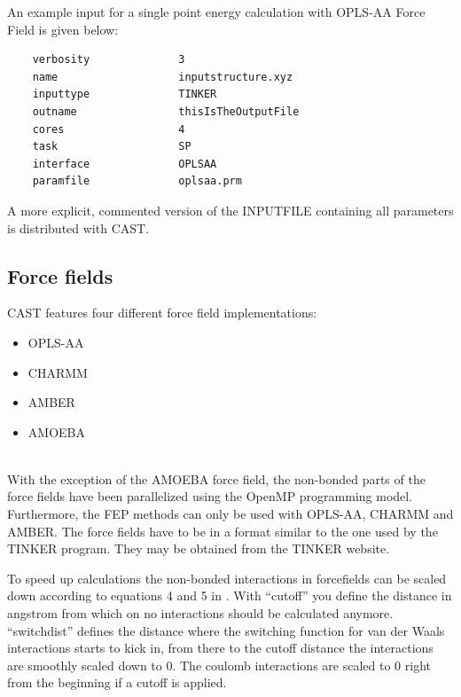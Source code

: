 \documentclass[10pt,a4paper]{article} %
\begin{document}
	An example input for a single point energy calculation with \ac{OPLS-AA} Force Field\supercite{oplsaa, oplsaa2} is given below:
	
	\begin{lstlisting}
	verbosity              3
	name                   inputstructure.xyz
	inputtype              TINKER
	outname                thisIsTheOutputFile
	cores                  4
	task                   SP
	interface              OPLSAA
	paramfile              oplsaa.prm\end{lstlisting}

	A more explicit, commented version of the INPUTFILE containing all parameters is distributed with \ac{CAST}.
		
	\subsection{Force fields}
	\ac{CAST} features four different force field implementations:\\
	\begin{itemize}
	 \item \acf{OPLS-AA}\supercite{oplsaa, oplsaa2} \item \acf{CHARMM}\supercite{charmm}
	 \item \acf{AMBER}\supercite{amber}
	 \item \acf{AMOEBA}\supercite{amoeba_current, amoeba_current2}
	\end{itemize}~\\
	With the exception of the \ac{AMOEBA} force field, the non-bonded parts of the force fields have been parallelized using the OpenMP programming model. Furthermore, the \ac{FEP} methods can only be used with \ac{OPLS-AA}, \ac{CHARMM} and \ac{AMBER}. The force fields have to be in a format similar to the one used by the TINKER\supercite{tinker} program. They may be obtained from the TINKER\supercite{tinker} website.
	
	To speed up calculations the non-bonded interactions in forcefields can be scaled down according to equations 4 and 5 in \cite{steinbach_new_1994}. With ``cutoff'' you define the distance in angstrom from which on no interactions should be calculated anymore. ``switchdist'' defines the distance where the switching function for van der Waals interactions starts to kick in, from there to the cutoff distance the interactions are smoothly scaled down to 0. The coulomb interactions are scaled to 0 right from the beginning if a cutoff is applied. 
	
\end{document}
